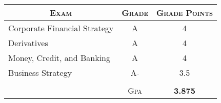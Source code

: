 \documentclass[a4paper,10pt]{article} %
\begin{document}
\begin{center}
\begin{tabular}{lcc}
\multicolumn{1}{c}{\textsc{Exam}} & \textsc{Grade} & \textsc{Grade Points}\\
\hline
Corporate Financial Strategy & A & 4\\
Derivatives & A & 4\\
Money, Credit, and Banking & A & 4\\
Business Strategy & A- & 3.5\\
& &\\\cline{2-3}
& \textsc{Gpa} & \textbf{3.875}
\end{tabular}
\end{center}

\end{document}
